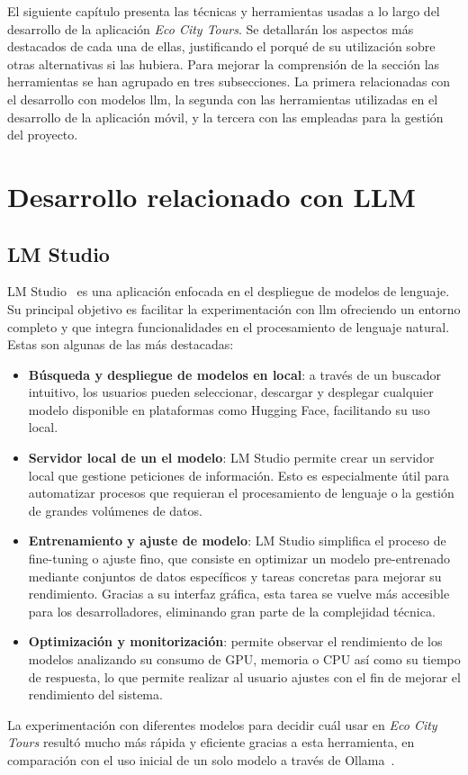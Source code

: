 
El siguiente capítulo presenta las técnicas y herramientas usadas a lo largo del desarrollo de la aplicación \textit{Eco City Tours}. Se detallarán los aspectos más destacados de cada una de ellas, justificando el porqué de su utilización sobre otras alternativas si las hubiera. Para mejorar la comprensión de la sección las herramientas se han agrupado en tres subsecciones. La primera relacionadas con el desarrollo con modelos \acrshort{llm}, la segunda con las herramientas utilizadas en el desarrollo de la aplicación móvil, y la tercera con las empleadas para la gestión del proyecto.


\section{Desarrollo relacionado con LLM}
	\subsection{LM Studio}
	LM Studio~\cite{lmstudio_ai} es una aplicación enfocada en el despliegue de modelos de lenguaje. Su principal objetivo es facilitar la experimentación con \acrlong{llm} ofreciendo un entorno completo y que integra funcionalidades en el procesamiento de lenguaje natural.
	Estas son algunas de las más destacadas:
	
	\begin{itemize}
		
		\item \textbf{Búsqueda y despliegue de modelos en local}: a través de un buscador intuitivo, los usuarios pueden seleccionar, descargar y desplegar cualquier modelo disponible en plataformas como Hugging Face, facilitando su uso local.
		
		\item \textbf{Servidor local de un el modelo}: LM Studio permite crear un servidor local que gestione peticiones de información. Esto es especialmente útil para automatizar procesos que requieran el procesamiento de lenguaje o la gestión de grandes volúmenes de datos.
		
		\item \textbf{Entrenamiento y ajuste de modelo}: LM Studio simplifica el proceso de fine-tuning o ajuste fino, que consiste en optimizar un modelo pre-entrenado mediante conjuntos de datos específicos y tareas concretas para mejorar su rendimiento. Gracias a su interfaz gráfica, esta tarea se vuelve más accesible para los desarrolladores, eliminando gran parte de la complejidad técnica.
		
		\item \textbf{Optimización y monitorización}: permite observar el rendimiento de los modelos analizando su consumo de GPU, memoria o CPU así como su tiempo de respuesta, lo que permite realizar al usuario ajustes con el fin de mejorar el rendimiento del sistema.
	\end{itemize}
	La experimentación con diferentes modelos para decidir cuál usar en \textit{Eco City Tours} resultó mucho más rápida y eficiente gracias a esta herramienta, en comparación con el uso inicial de un solo modelo a través de Ollama~\cite{ollama}.
		
